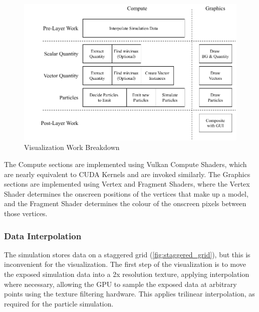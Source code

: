 \begin{figure}
    \centering
    \includegraphics[width=\linewidth]{Ch42Design/figures/FinalReport_VizWork.pdf}
    \caption{Visualization Work Breakdown}
    \label{fig:VizBreakdown}
\end{figure}

The Compute sections are implemented using Vulkan Compute Shaders\cite{TheKhronosGroupVulkanSpec}, which are nearly equivalent to CUDA Kernels and are invoked similarly.
The Graphics sections are implemented using Vertex and Fragment Shaders, where the Vertex Shader determines the onscreen positions of the vertices that make up a model, and the Fragment Shader determines the colour of the onscreen pixels between those vertices.

\subsubsection{Data Interpolation}
The simulation stores data on a staggered grid (\cref{fig:staggered_grid}), but this is inconvenient for the visualization.%
The first step of the visualization is to move the exposed simulation data into a 2x resolution texture, applying interpolation where necessary, allowing the GPU to sample the exposed data at arbitrary points using the texture filtering hardware.
This applies trilinear interpolation, as required for the particle simulation.


